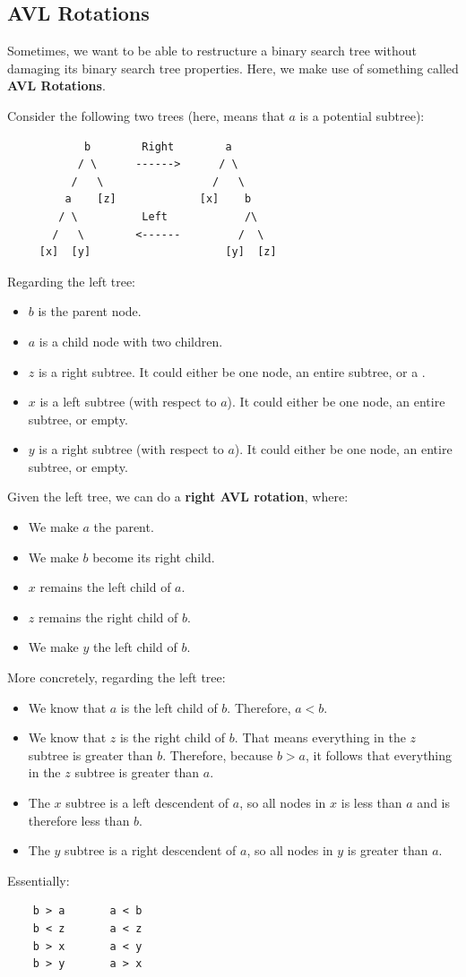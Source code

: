 \documentclass[letterpaper]{article}
\begin{document}
\subsection{AVL Rotations}
Sometimes, we want to be able to restructure a binary search tree without damaging its binary search tree properties. Here, we make use of something called \textbf{AVL Rotations}.

\bigskip 

Consider the following two trees (here, \code{[a]} means that $a$ is a potential subtree): 
\begin{verbatim}
            b        Right        a
           / \      ------>      / \ 
          /   \                 /   \ 
         a    [z]             [x]    b
        / \          Left            /\
       /   \        <------         /  \
     [x]  [y]                     [y]  [z]
\end{verbatim}
Regarding the left tree: 
\begin{itemize}
    \item $b$ is the parent node. 
    \item $a$ is a child node with two children. 
    \item $z$ is a right subtree. It could either be one node, an entire subtree, or a . 
    \item $x$ is a left subtree (with respect to $a$). It could either be one node, an entire subtree, or empty. 
    \item $y$ is a right subtree (with respect to $a$). It could either be one node, an entire subtree, or empty. 
\end{itemize}
Given the left tree, we can do a \textbf{right AVL rotation}, where: 
\begin{itemize}
    \item We make $a$ the parent. 
    \item We make $b$ become its right child. 
    \item $x$ remains the left child of $a$. 
    \item $z$ remains the right child of $b$. 
    \item We make $y$ the left child of $b$. 
\end{itemize}
More concretely, regarding the left tree: 
\begin{itemize}
    \item We know that $a$ is the left child of $b$. Therefore, $a < b$. 
    \item We know that $z$ is the right child of $b$. That means everything in the $z$ subtree is greater than $b$. Therefore, because $b > a$, it follows that everything in the $z$ subtree is greater than $a$. 
    \item The $x$ subtree is a left descendent of $a$, so all nodes in $x$ is less than $a$ and is therefore less than $b$. 
    \item The $y$ subtree is a right descendent of $a$, so all nodes in $y$ is greater than $a$. 
\end{itemize}
Essentially: 
\begin{verbatim}
    b > a       a < b 
    b < z       a < z
    b > x       a < y
    b > y       a > x
\end{verbatim}
\end{document}

